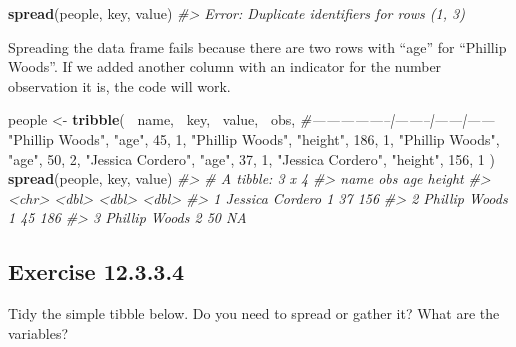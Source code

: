 \documentclass[]{book}
\newenvironment{Shaded}{\begin{snugshade}}{\end{snugshade}}
\newcommand{\CommentTok}[1]{\textcolor[rgb]{0.56,0.35,0.01}{\textit{#1}}}
\newcommand{\DecValTok}[1]{\textcolor[rgb]{0.00,0.00,0.81}{#1}}
\newcommand{\KeywordTok}[1]{\textcolor[rgb]{0.13,0.29,0.53}{\textbf{#1}}}
\newcommand{\NormalTok}[1]{#1}
\newcommand{\OperatorTok}[1]{\textcolor[rgb]{0.81,0.36,0.00}{\textbf{#1}}}
\newcommand{\StringTok}[1]{\textcolor[rgb]{0.31,0.60,0.02}{#1}}
\theoremstyle{plain}
\theoremstyle{remark}
\begin{document}
\begin{Shaded}
\begin{Highlighting}[]
\KeywordTok{spread}\NormalTok{(people, key, value)}
\CommentTok{#> Error: Duplicate identifiers for rows (1, 3)}
\end{Highlighting}
\end{Shaded}

Spreading the data frame fails because there are two rows with ``age''
for ``Phillip Woods''. If we added another column with an indicator for
the number observation it is, the code will work.

\begin{Shaded}
\begin{Highlighting}[]
\NormalTok{people <-}\StringTok{ }\KeywordTok{tribble}\NormalTok{(}
  \OperatorTok{~}\NormalTok{name,             }\OperatorTok{~}\NormalTok{key,    }\OperatorTok{~}\NormalTok{value, }\OperatorTok{~}\NormalTok{obs,}
  \CommentTok{#-----------------|--------|------|------}
  \StringTok{"Phillip Woods"}\NormalTok{,   }\StringTok{"age"}\NormalTok{,       }\DecValTok{45}\NormalTok{, }\DecValTok{1}\NormalTok{,}
  \StringTok{"Phillip Woods"}\NormalTok{,   }\StringTok{"height"}\NormalTok{,   }\DecValTok{186}\NormalTok{, }\DecValTok{1}\NormalTok{,}
  \StringTok{"Phillip Woods"}\NormalTok{,   }\StringTok{"age"}\NormalTok{,       }\DecValTok{50}\NormalTok{, }\DecValTok{2}\NormalTok{,}
  \StringTok{"Jessica Cordero"}\NormalTok{, }\StringTok{"age"}\NormalTok{,       }\DecValTok{37}\NormalTok{, }\DecValTok{1}\NormalTok{,}
  \StringTok{"Jessica Cordero"}\NormalTok{, }\StringTok{"height"}\NormalTok{,   }\DecValTok{156}\NormalTok{, }\DecValTok{1}
\NormalTok{)}
\KeywordTok{spread}\NormalTok{(people, key, value)}
\CommentTok{#> # A tibble: 3 x 4}
\CommentTok{#>   name              obs   age height}
\CommentTok{#>   <chr>           <dbl> <dbl>  <dbl>}
\CommentTok{#> 1 Jessica Cordero     1    37    156}
\CommentTok{#> 2 Phillip Woods       1    45    186}
\CommentTok{#> 3 Phillip Woods       2    50     NA}
\end{Highlighting}
\end{Shaded}

\hypertarget{exercise-12.3.3.4}{%
\subsection*{\texorpdfstring{Exercise
{12.3.3.4}}{Exercise 12.3.3.4}}\label{exercise-12.3.3.4}}

Tidy the simple tibble below. Do you need to spread or gather it? What
are the variables?
\end{document}
